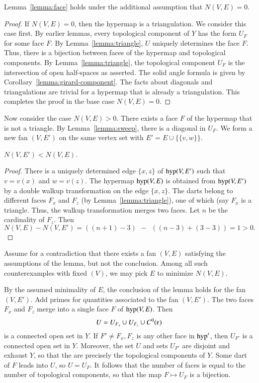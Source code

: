 \begin{lemma} Lemma~\ref{lemma:face} holds under the additional assumption that $N(V,E) = 0$.
\end{lemma}

\begin{proof}
If $N(V,E)=0$, then the hypermap is a triangulation.  We consider this
case first.  By earlier lemmas, every topological component of $Y$ has
the form $U_F$ for some face $F$.  By Lemma~\ref{lemma:triangle}, $U$ uniquely determines the face $F$.  Thus, there is a bijection between faces of the hypermap and topological components.  By Lemma~\ref{lemma:triangle}, the topological component $U_F$ is the intersection of open half-spaces as asserted.  The solid angle formula is given by Corollary~\ref{lemma:girard-component}.  The facts about diagonals and triangulations are trivial for a hypermap that is already a triangulation. This completes the proof in the base case $N(V,E)=0$.
\end{proof}

Now consider the case $N(V,E)>0$.  There exists a face $F$ of the hypermap that is not a triangle.  By Lemma~\ref{lemma:sweep}, there is a diagonal in $U_F$. We form a new fan $(V,E')$ on the same vertex set with
$E' = E\cup \{\{v,w\}\}$.   

\begin{lemma} 
$N(V,E')<N(V,E)$.
\end{lemma}


\begin{proof}  There is a uniquely determined edge $\{x,z\}$ of ${\operatorname{hyp}}(V,E')$ such that $v=v(x)$ and $w=v(z)$.   The hypermap ${\operatorname{hyp}}(V,E)$ is obtained from ${\operatorname{hyp}}(V,E')$ by a double walkup transformation on the edge $\{x,z\}$.  The darts belong to different faces $F_x$ and $F_z$ (by Lemma~\ref{lemma:triangle}), one of which (say $F_x$ is a triangle.  Thus, the walkup transformation merges two faces.  Let $n$ be the cardinality of $F_z$. Then 
$$N(V,E) - N(V,E') = ((n+1)-3) ~~-~~ ((n-3) + (3-3)) = 1 >0.$$
\end{proof}

Assume for a contradiction that there exists a fan $(V,E)$ 
satisfying the assumptions of the lemma, but not the conclusion.
Among all such counterexamples with fixed $(V)$, we may pick
$E$ to minimize  $N(V,E)$.

By the assumed minimality of $E$, the conclusion of the lemma holds for the
fan $(V,E')$.  Add primes
for quantities associated to the fan $(V,E')$.  The two faces
$F_x$ and $F_z$ merge into a single face $F$ of ${\operatorname{hyp}}(V,E)$.
Then 
\begin{equation}\label{eqn:U}
U= U_{F_x}\cup U_{F_z}\cup C^0(\e)
\end{equation} 
is a connected open set in $Y$.
If $F'\ne F_x,F_z$ is any other face in ${\operatorname{hyp}}'$, then $U_{F'}$ is
a connected open set in $Y$.  Moreover, the set $U$ and sets $U_{F'}$
are disjoint and exhaust $Y$, so that the are precisely the topological
components of $Y$.  Some dart of $F$ leads into $U$, so $U=U_F$.  It follows
that the number of faces is equal to the number of topological components, so that the map $F\mapsto U_F$ is a bijection.

